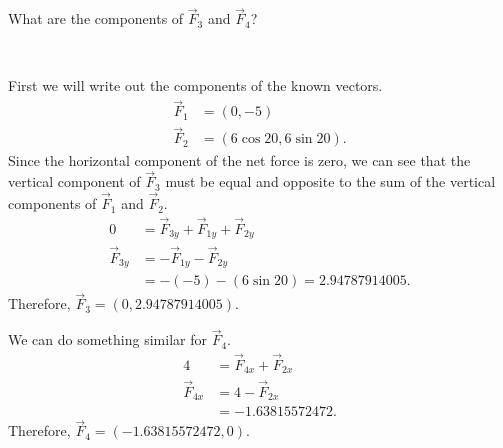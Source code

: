 What are the components of  $\vec{F}_{3}$ and $\vec{F}_{4}$?

~

\begin{solution}

	First we will write out the components of the known vectors.
	\begin{align*}
		\vec{F}_{1} &= \left( 0, -5 \right) \\
		\vec{F}_{2} &= \left( 6 \cos 20, 6 \sin 20 \right)
		.\end{align*}
	Since the horizontal component of the net force is zero, we can see that the vertical component of $\vec{F}_{3}$ must be equal and opposite to the sum of the vertical components of $\vec{F}_{1}$ and $\vec{F}_{2}$.
	\begin{align*}
		0 &= \vec{F}_{3y} + \vec{F}_{1y} + \vec{F}_{2y} \\
		\vec{F}_{3y} &= -\vec{F}_{1y} - \vec{F}_{2y} \\
		&= -\left( -5 \right) - \left( 6 \sin 20 \right) = 2.94787914005
		.\end{align*}
	Therefore, $\vec{F}_{3} = \left( 0, 2.94787914005 \right)$.

	We can do something similar for $\vec{F}_{4}$.
	\begin{align*}
		4 &= \vec{F}_{4x} + \vec{F}_{2x} \\
		\vec{F}_{4x} &= 4 - \vec{F}_{2x} \\
		&= -1.63815572472
		.\end{align*}
	Therefore, $\vec{F}_{4} = \left( -1.63815572472, 0 \right)$.
\end{solution}

